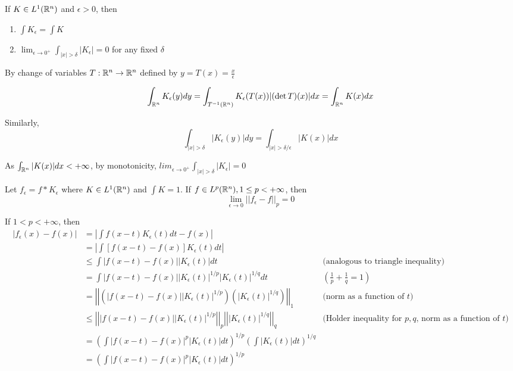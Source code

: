\documentclass{report}
\begin{document}
\begin{lemma}
    If $K \in L^1(\mathbb{R}^n)$ and $\epsilon > 0$, then 
    \begin{enumerate}
        \item $\int K_\epsilon = \int K$
        \item $\lim_{\epsilon \to 0^+} \int_{|x| > \delta} |K_\epsilon| = 0$ for any fixed $\delta$
    \end{enumerate}
\end{lemma}

By change of variables $T: \mathbb{R}^n \to \mathbb{R}^n$ defined by $y = T(x) = \frac{x}{\epsilon}$

\[
    \int_{\mathbb{R}^n} K_\epsilon(y) dy = \int_{T^{-1}(\mathbb{R}^n)} K_\epsilon(T(x)) |(\det T)(x)| dx = \int_{\mathbb{R}^n} K(x) dx
\]

Similarly,
\[
    \int_{|x| > \delta} |K_\epsilon(y)| dy = \int_{|x| > \delta/\epsilon} |K(x)| dx
\]

As $\int_{\mathbb{R}^n} |K(x)| dx < +\infty$, by monotonicity, $lim_{\epsilon \to 0^+} \int_{|x| > \delta} |K_\epsilon| = 0$

\begin{theorem}
    Let $f_\epsilon = f * K_\epsilon$ where $K \in L^1(\mathbb{R}^n)$ and $\int K = 1$. If $f \in L^p(\mathbb{R}^n), 1 \leq p < +\infty$, then 
    \[
        \lim_{\epsilon \to 0} ||f_\epsilon - f||_p = 0 
    \]
\end{theorem}

If $1 < p < +\infty$, then
\begin{align*}
    |f_\epsilon(x) - f(x)|
    &= \left| \int f(x-t) K_\epsilon(t) dt - f(x) \right| \\
    &= \left| \int [f(x-t) - f(x)] K_\epsilon(t) dt \right| \\
    &\leq \int |f(x-t) - f(x)| |K_\epsilon(t)| dt &\text{(analogous to triangle inequality)}\\
    &= \int |f(x-t) - f(x)| |K_\epsilon(t)|^{1/p} |K_\epsilon(t)|^{1/q} dt &\text{$\left( \frac{1}{p} + \frac{1}{q} = 1\right)$} \\
    &= \left|\left| \left(|f(x-t) - f(x)| |K_\epsilon(t)|^{1/p}\right) \left(|K_\epsilon(t)|^{1/q} \right) \right|\right|_1 &\text{(norm as a function of $t$)}\\
    &\leq \left|\left| |f(x-t) - f(x)| |K_\epsilon(t)|^{1/p} \right|\right|_p \left|\left| |K_\epsilon(t)|^{1/q}\right|\right|_q &\text{(Holder inequality for $p, q$, norm as a function of $t$)} \\
    &= \left(\int |f(x-t) - f(x)|^p |K_\epsilon(t)| dt \right)^{1/p} \left( \int |K_\epsilon(t)| dt \right)^{1/q} \\
    &= \left(\int |f(x-t) - f(x)|^p |K_\epsilon(t)| dt \right)^{1/p} 
\end{align*}
\end{document}
